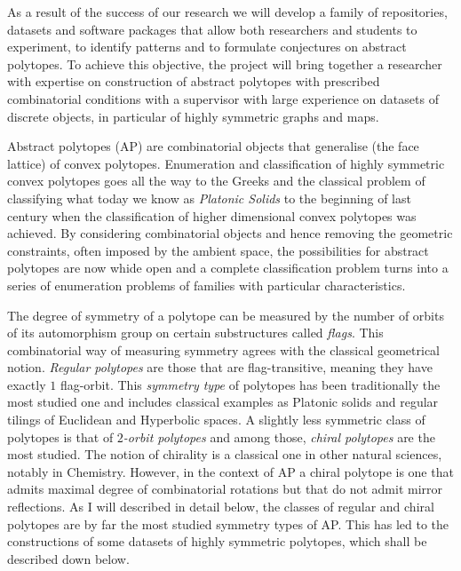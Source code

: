 As a result of the success of our research we will develop a family of repositories, datasets and software packages that allow both researchers and students to experiment, to identify patterns and to formulate conjectures on abstract polytopes.
To achieve this objective, the project will bring together a researcher with expertise on construction of abstract polytopes with prescribed combinatorial conditions with a supervisor with large experience on datasets of discrete objects, in particular of highly symmetric graphs and maps.

{}

Abstract polytopes (AP) are combinatorial objects that generalise (the face lattice) of convex polytopes.
Enumeration and classification of highly symmetric convex polytopes goes all the way to the Greeks and the classical problem of classifying what today we know as \emph{Platonic Solids} to the beginning of last century when the classification of higher dimensional convex polytopes was achieved.
By considering combinatorial objects and hence removing the geometric constraints, often imposed by the ambient space, the possibilities for abstract polytopes are now whide open and a complete classification problem turns into a series of enumeration problems of families with particular characteristics.

The degree of symmetry of a polytope can be measured by the number of orbits of its automorphism group on certain substructures called \emph{flags}.
This combinatorial way of measuring symmetry agrees with the classical geometrical notion.
\emph{Regular polytopes} are those that are flag-transitive, meaning they have exactly $1$ flag-orbit.
This \emph{symmetry type} of polytopes has been traditionally the most studied one and includes classical examples as Platonic solids and regular tilings of Euclidean and Hyperbolic spaces.
A slightly less symmetric class of polytopes is that of \emph{$2$-orbit polytopes} and among those, \emph{chiral polytopes} are the most studied.
The notion of chirality is a classical one in other natural sciences, notably in Chemistry.
However, in the context of AP a chiral polytope is one that admits maximal degree of combinatorial rotations but that do not admit mirror reflections.
As I will described in detail below, the classes of regular and chiral polytopes are by far the most studied symmetry types of AP.
This has led to the constructions of some datasets of highly symmetric polytopes, which  shall be described down below.


